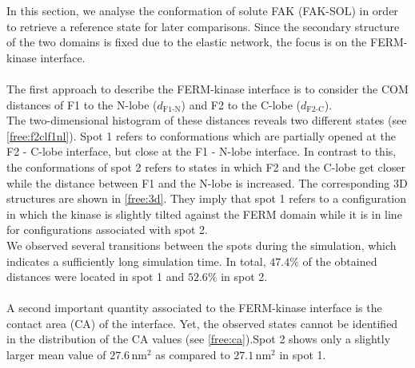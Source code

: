 \label{sec:fak_sol}
In this section, we analyse the conformation of solute FAK (FAK-SOL) in order to retrieve a reference state for later comparisons. Since the secondary structure of the two domains is fixed due to the elastic network, the focus is on the FERM-kinase interface.\\
\\
The first approach to describe the FERM-kinase interface is to consider the COM distances of F1 to the N-lobe ($d_\text{F1-N}$) and F2 to the C-lobe ($d_\text{F2-C}$).\\
The two-dimensional histogram of these distances reveals two different states (see \autoref{free:f2clf1nl}). Spot 1 refers to conformations which are partially opened at the F2 - C-lobe interface, but close at the F1 - N-lobe interface. In contrast to this, the conformations of spot 2 refers to states in which F2 and the C-lobe get closer while the distance between F1 and the N-lobe is increased. The corresponding 3D structures are shown in \autoref{free:3d}. They imply that spot 1 refers to a configuration in which the kinase is slightly tilted against the FERM domain while it is in line for configurations associated with spot 2.\\
We observed several transitions between the spots during the simulation, which indicates a sufficiently long simulation time. In total, $47.4\%$ of the obtained distances were located in spot 1 and $52.6\%$ in spot 2.\\
\\
A second important quantity associated to the FERM-kinase interface is the contact area (CA) of the interface. Yet, the observed states cannot be identified in the distribution of the CA values (see \autoref{free:ca}).Spot 2 shows only a slightly larger mean value of $27.6\,\si{\nano\metre}^2$ as compared to $27.1\,\si{\nano\metre}^2$ in spot 1.\\
%
%
%
